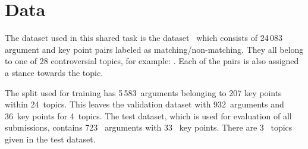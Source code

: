 \section{Data}\label{data}

The dataset used in this shared task is the \ArgKP dataset~\cite{Bar-HaimEFKLS2020} which consists of 24\,083 argument and key point pairs labeled as matching/non-matching. They all belong to one of 28 controversial topics, for example: . Each of the pairs is also assigned a stance towards the topic. 

The split used for training has 5\,583~arguments belonging to 207 key points within 24~topics. This leaves the 
validation dataset with 932~arguments and 36~key points for 4~topics. The test dataset, which is used for evaluation of all submissions, contains 723~ arguments with 33~ key points. There are 3~ topics given in the test dataset.


